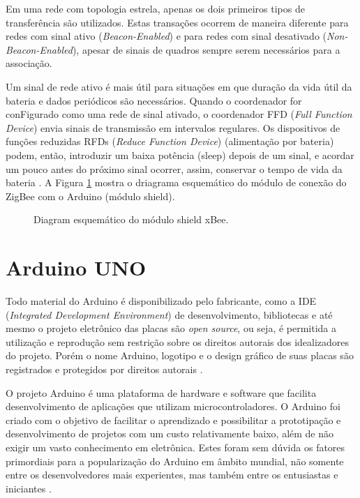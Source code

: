\documentclass[12pt,report,2019]{uftpibic}
\begin{document}
Em uma rede com topologia estrela, apenas os dois primeiros tipos de transferência são utilizados. Estas transações ocorrem de maneira diferente para redes com sinal ativo ({\it Beacon-Enabled}) e para redes com sinal desativado ({\it Non-Beacon-Enabled}), apesar de sinais de quadros sempre serem necessários para a associação.

Um sinal de rede ativo é mais útil para situações em que duração da vida útil da bateria e dados periódicos são necessários. Quando o coordenador for conFigurado como uma rede de sinal ativado, o coordenador FFD ({\it Full Function Device}) envia sinais de transmissão em intervalos regulares. Os dispositivos de funções reduzidas RFDs ({\it Reduce Function Device}) (alimentação por bateria) podem, então, introduzir um baixa potência (sleep) depois de um sinal, e acordar um pouco antes do próximo sinal ocorrer, assim, conservar o tempo de vida da bateria \cite{marcos}. A Figura \ref{fig:xbee} mostra o driagrama esquemático do módulo de conexão do ZigBee com o Arduino (módulo shield).

\begin{figure}[!h]
\centering
\caption{Diagram esquemático do módulo shield xBee.}
\label{fig:xbee}
\end{figure}

\section{Arduino UNO}

Todo material do Arduino é disponibilizado pelo fabricante, como a IDE ({\it Integrated Development Environment}) de desenvolvimento, bibliotecas e até mesmo o projeto eletrônico das placas são {\it open source}, ou seja, é permitida a utilização e reprodução sem restrição sobre os direitos autorais dos idealizadores do projeto. Porém o nome Arduino, logotipo e o design gráfico de suas placas são registrados e protegidos por direitos autorais \cite{marcos}.

O projeto Arduino é uma plataforma de hardware e software que facilita desenvolvimento de aplicações que utilizam microcontroladores. O Arduino foi criado com o objetivo de facilitar o aprendizado e possibilitar a prototipação e desenvolvimento de projetos com um custo relativamente baixo, além de não exigir um vasto conhecimento em eletrônica. Estes foram sem dúvida os fatores primordiais para a popularização do Arduino em âmbito mundial, não somente entre os desenvolvedores mais experientes, mas também entre os entusiastas e iniciantes \cite{marcos}.
\end{document}
